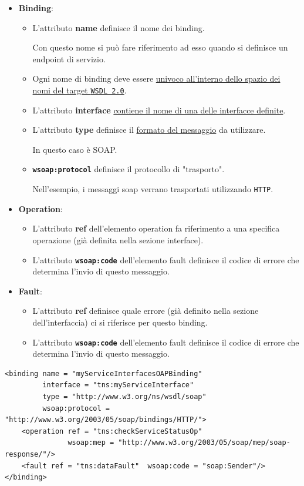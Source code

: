 \begin{itemize}
    \item \textbf{Binding}:
    \begin{itemize}
    \item L'attributo \textbf{name} definisce il nome dei binding.

    Con questo nome si può fare riferimento ad esso quando si definisce un endpoint di servizio.
    \item Ogni nome di binding deve essere \uline{univoco all'interno dello spazio dei nomi del target \texttt{WSDL 2.0}}.
    \item L'attributo \textbf{interface} \uline{contiene il nome di una delle interfacce definite}.
    \item L'attributo \textbf{type} definisce il \uline{formato del messaggio} da utilizzare.

    In questo caso è SOAP.
    \item \textbf{\texttt{wsoap:protocol}} definisce il protocollo di "trasporto".

    Nell'esempio, i messaggi soap verrano trasportati utilizzando \texttt{HTTP}.
\end{itemize}
    \item \textbf{Operation}:
    \begin{itemize}
        \item L'attributo \textbf{ref} dell'elemento operation fa riferimento a una specifica operazione (già definita nella sezione interface).
        \item L'attributo \textbf{\texttt{wsoap:code}} dell'elemento fault definisce il codice di errore che determina l'invio di questo messaggio.
    \end{itemize}
    \item \textbf{Fault}:
    \begin{itemize}
        \item L'attributo \textbf{ref} definisce quale errore (già definito nella sezione dell'interfaccia) ci si riferisce per questo binding.
        \item L'attributo \textbf{\texttt{wsoap:code}} dell'elemento fault definisce il codice di errore che determina l'invio di questo messaggio.
    \end{itemize}
\end{itemize}

\begin{tcolorbox}[breakable,after title*={Esempio di binding}]
    \begin{lstlisting}
<binding name = "myServiceInterfacesOAPBinding"
         interface = "tns:myServiceInterface"
         type = "http://www.w3.org/ns/wsdl/soap"
         wsoap:protocol = "http://www.w3.org/2003/05/soap/bindings/HTTP/">
    <operation ref = "tns:checkServiceStatusOp"
               wsoap:mep = "http://www.w3.org/2003/05/soap/mep/soap-response/"/>
    <fault ref = "tns:dataFault"  wsoap:code = "soap:Sender"/>
</binding>
    \end{lstlisting}
\end{tcolorbox}

